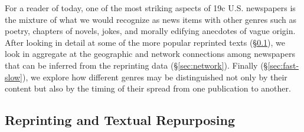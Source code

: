 \documentclass[pdftex,11pt]{article}
\begin{document}
For a reader of today, one of the most striking aspects of 19c
U.S. newspapers is the mixture of what we would recognize as news
items with other genres such as poetry, chapters of novels, jokes, and
morally edifying anecdotes of vague origin.  After looking in detail
at some of the more popular reprinted texts
(\S\ref{sec:top-reprints}), we look in aggregate at the geographic and
network connections among newspapers that can be inferred from the
reprinting data (\S\ref{sec:network}).  Finally
(\S\ref{sec:fast-slow}), we explore how different genres may be
distinguished not only by their content but also by the timing of
their spread from one publication to another.

\subsection{Reprinting and Textual Repurposing}
\label{sec:top-reprints}
\end{document}

